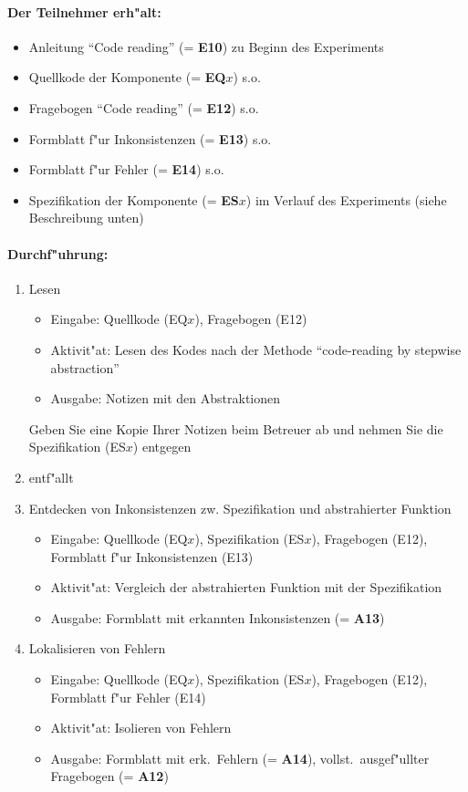 \paragraph{Der Teilnehmer erh"alt:}  
\begin{itemize}
	\item Anleitung "`Code reading"' (= {\bf E10}) zu Beginn des Experiments
	\item Quellkode der Komponente (= {\bf EQ$x$}) s.o.
	\item Fragebogen "`Code reading"' (= {\bf E12}) s.o.
	\item Formblatt f"ur Inkonsistenzen (= {\bf E13}) s.o.
	\item Formblatt f"ur Fehler (= {\bf E14}) s.o.
	\item Spezifikation der Komponente (= {\bf ES$x$}) im Verlauf des Experiments
				(siehe Beschreibung unten) 
\end{itemize}

\paragraph{Durchf"uhrung:} 
\begin{enumerate}
	\item Lesen
	\begin{itemize}
		\item Eingabe: Quellkode (EQ$x$), Fragebogen (E12)
		\item Aktivit"at: Lesen des Kodes nach der Methode "`code-reading by 
			stepwise abstraction"'
		\item Ausgabe: Notizen mit den Abstraktionen
	\end{itemize}
	Geben Sie eine Kopie Ihrer Notizen beim Betreuer ab und nehmen Sie die 
	Spezifikation (ES$x$) entgegen
	\item entf"allt
	\item Entdecken von Inkonsistenzen zw. Spezifikation und abstrahierter 
		Funktion
	\begin{itemize}
		\item Eingabe: Quellkode (EQ$x$), Spezifikation (ES$x$), Fragebogen (E12),
			Formblatt f"ur Inkonsistenzen (E13)
		\item Aktivit"at: Vergleich der abstrahierten Funktion mit der
			Spezifikation 
		\item Ausgabe: Formblatt mit erkannten Inkonsistenzen (= {\bf A13})
	\end{itemize}
	\item Lokalisieren von Fehlern
	\begin{itemize}
		\item Eingabe: Quellkode (EQ$x$), Spezifikation (ES$x$), Fragebogen (E12),
			Formblatt f"ur Fehler (E14)
		\item Aktivit"at: Isolieren von Fehlern
		\item Ausgabe: Formblatt mit erk.~Fehlern (= {\bf A14}), 
			vollst.~ausgef"ullter Fragebogen (= {\bf A12})
	\end{itemize}
\end{enumerate}

